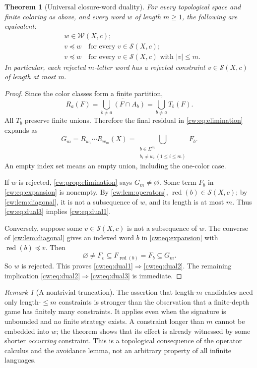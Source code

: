 \documentclass[11pt,letterpaper]{article}
\numberwithin{equation}{section}
\newtheorem{theorem}{Theorem}[section]
\theoremstyle{definition}
\theoremstyle{remark}
\newtheorem{remark}[remark]{Remark}
\theoremstyle{definition}
\newcommand{\W}{\mathcal W}
\newcommand{\red}{\operatorname{red}}
\newcommand{\len}[1]{\lvert #1\rvert}
\newcommand{\cwcl}[1]{\overline{#1}}
\newcommand{\cwSig}{\mathcal S}
\begin{document}
\begin{theorem}[Universal closure-word duality]\label{cw:thm:duality}
For every topological space and finite coloring as above, and every word
$w$ of length $m\ge1$, the following are equivalent:
\begin{align}
 &w\in\W(X,c);\label{cw:eq:dual1}\\
 &v\preceq w\quad\text{for every }v\in\cwSig(X,c);\label{cw:eq:dual2}\\
 &v\preceq w\quad\text{for every }v\in\cwSig(X,c)
       \text{ with }\len v\le m.\label{cw:eq:dual3}
\end{align}
In particular, each rejected $m$-letter word has a rejected constraint
$v\in\cwSig(X,c)$ of length at most $m$.
\end{theorem}
\begin{proof}
Since the color classes form a finite partition,
\[
 R_a(F)=\cwcl{\bigcup_{b\ne a}(F\cap A_b)}
       =\bigcup_{b\ne a}T_b(F).
\]
All $T_b$ preserve finite unions. Therefore the final residual in
\eqref{cw:eq:elimination} expands as
\begin{equation}\label{cw:eq:expansion}
 G_m=R_{w_1}\cdots R_{w_m}(X)
     =\bigcup_{\substack{b\in\Sigma^m\\ b_i\ne w_i\ (1\le i\le m)}}F_b.
\end{equation}
An empty index set means an empty union, including the one-color case.

If $w$ is rejected, \cref{cw:prop:elimination} says $G_m\ne\varnothing$.
Some term $F_b$ in \eqref{cw:eq:expansion} is nonempty. By
\cref{cw:lem:operators}, $\red(b)\in\cwSig(X,c)$; by
\cref{cw:lem:diagonal}, it is not a subsequence of $w$, and its length is at
most $m$. Thus \eqref{cw:eq:dual3} implies \eqref{cw:eq:dual1}.

Conversely, suppose some $v\in\cwSig(X,c)$ is not a subsequence of $w$.
The converse of \cref{cw:lem:diagonal} gives an indexed word $b$ in
\eqref{cw:eq:expansion} with $\red(b)\preceq v$. Then
\[
 \varnothing\ne F_v\subseteq F_{\red(b)}=F_b\subseteq G_m.
\]
So $w$ is rejected. This proves \eqref{cw:eq:dual1}$\Rightarrow$\eqref{cw:eq:dual2}.
The remaining implication \eqref{cw:eq:dual2}$\Rightarrow$\eqref{cw:eq:dual3} is
immediate.
\end{proof}

\begin{remark}[A nontrivial truncation]
The assertion that length-$m$ candidates need only length-$\le m$ constraints
is stronger than the observation that a finite-depth game has finitely many
constraints. It applies even when the signature is unbounded and no finite
strategy exists. A constraint longer than $m$ cannot be embedded into $w$;
the theorem shows that its effect is already witnessed by some shorter
\emph{occurring} constraint. This is a topological consequence of the
operator calculus and the avoidance lemma, not an arbitrary property of
all infinite languages.
\end{remark}
\end{document}
